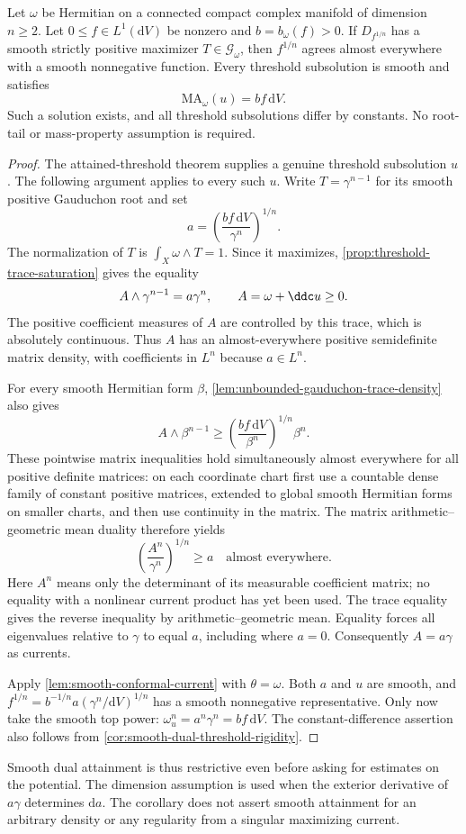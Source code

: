 \begin{corollary}\label{cor:smooth-dual-exact-equation}
Let $\omega$ be Hermitian on a connected compact complex manifold of dimension $n\geq2$. Let $0\leq f\in L^1(\mathrm{d}V)$ be nonzero and $b=b_\omega(f)>0$. If $D_{f^{1/n}}$ has a smooth strictly positive maximizer $T\in\mathscr G_\omega$, then $f^{1/n}$ agrees almost everywhere with a smooth nonnegative function. Every threshold subsolution is smooth and satisfies
\[
 \mathrm{MA}_\omega(u)=bf\,\mathrm{d}V.
\]
Such a solution exists, and all threshold subsolutions differ by constants. No root-tail or mass-property assumption is required.
\end{corollary}
\begin{proof}
The attained-threshold theorem supplies a genuine threshold subsolution $u$. The following argument applies to every such $u$. Write $T=\gamma^{n-1}$ for its smooth positive Gauduchon root and set
\[
 a=\left(\frac{bf\,\mathrm{d}V}{\gamma^n}\right)^{1/n}.
\]
The normalization of $T$ is $\int_X\omega\wedge T=1$. Since it maximizes, \cref{prop:threshold-trace-saturation} gives the equality
\[
 A\wedge\gamma^{n-1}=a\gamma^n,
 \qquad A=\omega+\ddc u\geq0.
\]
The positive coefficient measures of $A$ are controlled by this trace, which is absolutely continuous. Thus $A$ has an almost-everywhere positive semidefinite matrix density, with coefficients in $L^n$ because $a\in L^n$.

For every smooth Hermitian form $\beta$, \cref{lem:unbounded-gauduchon-trace-density} also gives
\[
 A\wedge\beta^{n-1}
 \geq\left(\frac{bf\,\mathrm{d}V}{\beta^n}\right)^{1/n}\beta^n.
\]
These pointwise matrix inequalities hold simultaneously almost everywhere for all positive definite matrices: on each coordinate chart first use a countable dense family of constant positive matrices, extended to global smooth Hermitian forms on smaller charts, and then use continuity in the matrix. The matrix arithmetic--geometric mean duality therefore yields
\[
 \left(\frac{A^n}{\gamma^n}\right)^{1/n}\geq a
 \quad\text{almost everywhere}.
\]
Here $A^n$ means only the determinant of its measurable coefficient matrix; no equality with a nonlinear current product has yet been used. The trace equality gives the reverse inequality by arithmetic--geometric mean. Equality forces all eigenvalues relative to $\gamma$ to equal $a$, including where $a=0$. Consequently $A=a\gamma$ as currents.

Apply \cref{lem:smooth-conformal-current} with $\theta=\omega$. Both $a$ and $u$ are smooth, and $f^{1/n}=b^{-1/n}a(\gamma^n/\mathrm{d}V)^{1/n}$ has a smooth nonnegative representative. Only now take the smooth top power: $\omega_u^n=a^n\gamma^n=bf\,\mathrm{d}V$. The constant-difference assertion also follows from \cref{cor:smooth-dual-threshold-rigidity}.
\end{proof}

Smooth dual attainment is thus restrictive even before asking for estimates on the potential. The dimension assumption is used when the exterior derivative of $a\gamma$ determines $\mathrm{d}a$. The corollary does not assert smooth attainment for an arbitrary density or any regularity from a singular maximizing current.
